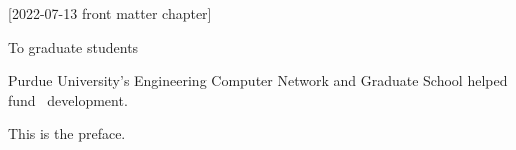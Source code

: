 [2022-07-13 front matter chapter]
%
%
%
%
%
%

%
%
%
\begin{statement}
\end{statement}

\begin{dedication}
  To graduate students
\end{dedication}

\begin{acknowledgments}
  Purdue University's Engineering Computer Network
  and Graduate School helped fund \PurdueThesisLogo\ development.
\end{acknowledgments}

\begin{preface}
  This is the preface.
\end{preface}

